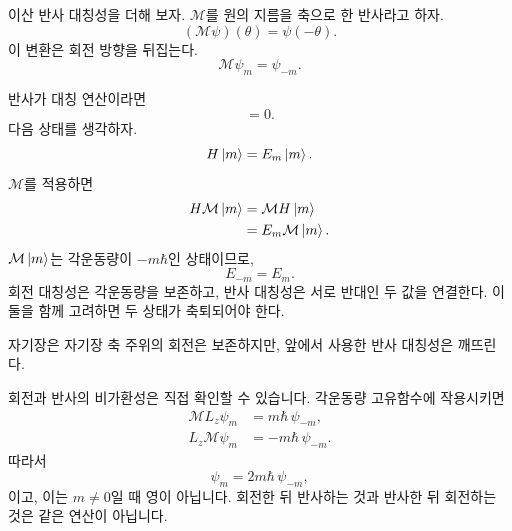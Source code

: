 이산 반사 대칭성을 더해 보자. \(\mathcal M\)를 원의 지름을 축으로 한 반사라고 하자.
\begin{equation}
(\mathcal M\psi)(\theta)=\psi(-\theta).
\end{equation}
이 변환은 회전 방향을 뒤집는다.
\begin{equation}
\mathcal M\psi_m=\psi_{-m}.
\end{equation}

반사가 대칭 연산이라면
\begin{equation}
[\mathcal M,H]=0.
\end{equation}
다음 상태를 생각하자.
\begin{equation}
H\left\lvert m\right\rangle=E_m\left\lvert m\right\rangle.
\end{equation}
\(\mathcal M\)를 적용하면
\begin{align}
H\mathcal M\left\lvert m\right\rangle
&=\mathcal M H\left\lvert m\right\rangle\\
&=E_m\mathcal M\left\lvert m\right\rangle.
\end{align}
\(\mathcal M\left\lvert m\right\rangle\)는 각운동량이 \(-m\hbar\)인 상태이므로,
\begin{equation}
E_{-m}=E_m.
\end{equation}
회전 대칭성은 각운동량을 보존하고, 반사 대칭성은 서로 반대인 두 값을 연결한다. 이 둘을 함께 고려하면 두 상태가 축퇴되어야 한다.

\begin{classroomqa}
\end{classroomqa}

자기장은 자기장 축 주위의 회전은 보존하지만, 앞에서 사용한 반사 대칭성은 깨뜨린다.

\begin{classroomqa}
\end{classroomqa}

회전과 반사의 비가환성은 직접 확인할 수 있습니다. 각운동량 고유함수에 작용시키면
\begin{align}
\mathcal M L_z\psi_m
&=m\hbar\,\psi_{-m},\\
L_z\mathcal M\psi_m
&=-m\hbar\,\psi_{-m}.
\end{align}
따라서
\begin{equation}
[\mathcal M,L_z]\psi_m
=2m\hbar\,\psi_{-m},
\end{equation}
이고, 이는 \(m\neq0\)일 때 영이 아닙니다. 회전한 뒤 반사하는 것과 반사한 뒤 회전하는 것은 같은 연산이 아닙니다.

